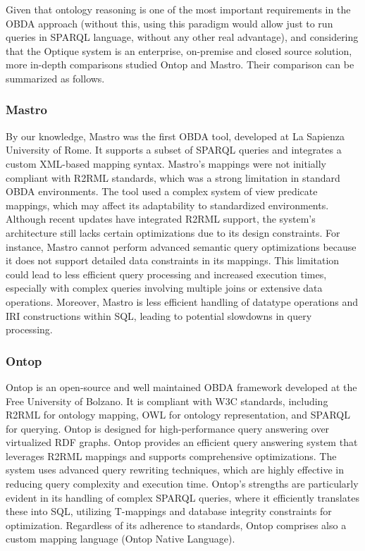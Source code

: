 Given that ontology reasoning is one of the most important requirements in the \ac{OBDA} approach (without this, using this paradigm would allow just to run queries in \ac{SPARQL} language, without any other real advantage), and considering that the Optique system is an enterprise, on-premise and closed source solution, more in-depth comparisons \cite{DBLP:conf/dlog/NamiciG18} studied Ontop and Mastro. Their comparison can be summarized as follows.

\subsubsection{Mastro}
By our knowledge, Mastro \cite{DBLP:journals/semweb/CalvaneseGLLPRRRS11} was the first \ac{OBDA} tool, developed at La Sapienza University of Rome. It supports a subset of \ac{SPARQL} queries and integrates a custom XML-based mapping syntax.
Mastro's mappings were not initially compliant with R2RML standards, which was a strong limitation in standard \ac{OBDA} environments. The tool used a complex system of view predicate mappings, which may affect its adaptability to standardized environments. Although recent updates have integrated R2RML support, the system's architecture still lacks certain optimizations due to its design constraints. For instance, Mastro cannot perform advanced semantic query optimizations because it does not support detailed data constraints in its mappings. This limitation could lead to less efficient query processing and increased execution times, especially with complex queries involving multiple joins or extensive data operations.
Moreover, Mastro is less efficient handling of datatype operations and IRI constructions within \ac{SQL}, leading to potential slowdowns in query processing.

\subsubsection{Ontop}
Ontop \cite{DBLP:conf/sebd/CalvaneseCKKKLR15} is an open-source and well maintained \ac{OBDA} framework developed at the Free University of Bolzano. It is compliant with \ac{W3C} standards, including R2RML for ontology mapping, \ac{OWL} for ontology representation, and \ac{SPARQL} for querying. Ontop is designed for high-performance query answering over virtualized \ac{RDF} graphs.
Ontop provides an efficient query answering system that leverages R2RML mappings and supports comprehensive optimizations. The system uses advanced query rewriting techniques, which are highly effective in reducing query complexity and execution time. Ontop's strengths are particularly evident in its handling of complex \ac{SPARQL} queries, where it efficiently translates these into \ac{SQL}, utilizing T-mappings and database integrity constraints for optimization.
Regardless of its adherence to standards, Ontop comprises also a custom mapping language (Ontop Native Language).

